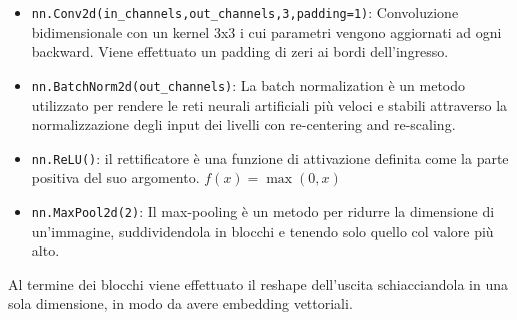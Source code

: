 \documentclass[12pt,a4paper,titlepage]{article}
\begin{document}
\begin{itemize}
	\item \texttt{nn.Conv2d(in\_channels,out\_channels,3,padding=1)}: Convoluzione bidimensionale con un kernel 3x3 i cui parametri vengono aggiornati ad ogni backward. Viene effettuato un padding di zeri ai bordi dell'ingresso.
	\item \texttt{nn.BatchNorm2d(out\_channels)}: La batch normalization è un metodo utilizzato per rendere le reti neurali artificiali più veloci e stabili attraverso la normalizzazione degli input dei livelli con re-centering and re-scaling.
	\item \texttt{nn.ReLU()}: il rettificatore è una funzione di attivazione definita come la parte positiva del suo argomento. $f(x)=\max(0,x)$
	\item \texttt{nn.MaxPool2d(2)}: Il max-pooling è un metodo per ridurre la dimensione di un’immagine, suddividendola in blocchi e tenendo solo quello col valore più alto.
\end{itemize}
Al termine dei blocchi viene effettuato il reshape dell'uscita schiacciandola in una sola dimensione, in modo da avere embedding vettoriali.
\end{document}
